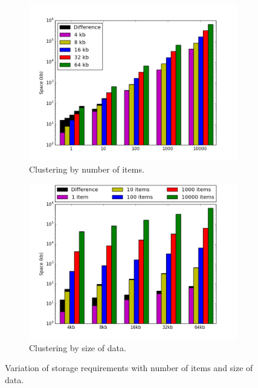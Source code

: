 \begin{figure}
\centering
\begin{subfigure}{.5\textwidth}
  \centering
  \includegraphics[width=1.1\linewidth]{images/storage_numbers}
  \caption{Clustering by number of items.}
\end{subfigure}%
\begin{subfigure}{.5\textwidth}
  \centering
  \includegraphics[width=1.1\linewidth]{images/storage_values}
  \caption{Clustering by size of data.}
\end{subfigure}
\caption{Variation of storage requirements with number of items and size of data.}
\label{fig:storage}
\end{figure}

